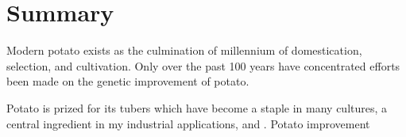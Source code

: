 \chapter{Summary}
\label{cha:Summary}

Modern potato exists as the culmination of millennium of domestication, selection, and cultivation. Only over the past 100 years have concentrated efforts been made on the genetic improvement of potato.

Potato is prized for its tubers which have become a staple in many cultures, a central ingredient in my industrial applications, and . Potato improvement 
